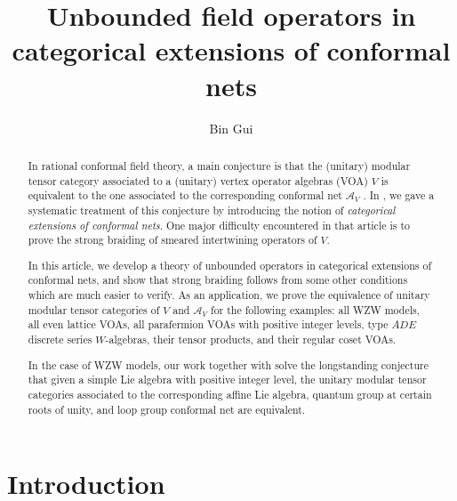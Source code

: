 \documentclass[12pt,a4paper]{article}
\title{Unbounded field operators in categorical extensions  of conformal nets}
\author{{\sc Bin Gui}%
}
\date{}
\theoremstyle{definition}
\theoremstyle{plain}
\newcommand{\mc}{\mathcal}
\numberwithin{equation}{subsection}
\begin{document}
\sloppy %
	\setcounter{section}{-1}
	
	\maketitle


	


	
	
	
	
	
	
\tableofcontents
	
\newpage


\begin{abstract}	
	
	
In  rational conformal field theory, a main conjecture is that the (unitary) modular tensor category associated to a (unitary) vertex operator algebras (VOA) $V$ is equivalent to the one associated to the corresponding  conformal net $\mc A_V$ \cite{Kaw15,Kaw18}. In \cite{Gui21a}, we gave a systematic treatment of this conjecture by introducing the notion of \emph{categorical extensions of conformal nets}. One major difficulty encountered in that article is to prove the strong braiding of smeared intertwining operators of $V$. 

In this article, we develop a theory of unbounded operators in categorical extensions of conformal nets, and show that strong braiding follows from some other conditions which are much easier to verify. As an application, we prove the equivalence of unitary modular tensor categories of $V$ and $\mc A_V$ for the following examples: all WZW models, all even lattice VOAs, all parafermion VOAs with positive integer levels,  type $ADE$ discrete series $W$-algebras,  their tensor products, and their regular coset VOAs.  

In the case of WZW models, our work together with \cite{Fin96} solve the longstanding conjecture that given a simple Lie algebra with positive integer level, the unitary modular tensor categories associated to the corresponding affine Lie algebra, quantum group at certain roots of unity, and loop group conformal net are equivalent.
\end{abstract}

\section{Introduction}
\end{document}
